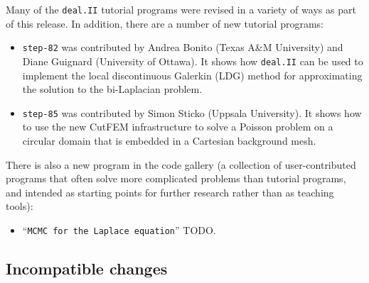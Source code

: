 \documentclass{ansarticle-preprint}
\newcommand{\specialword}[1]{\texttt{#1}}
\newcommand{\dealii}{{\specialword{deal.II}}\xspace}
\begin{document}
Many of the \dealii{} tutorial programs were revised in a variety of
ways as part of this release. In addition, there are a number of new tutorial programs:
\begin{itemize}
\item \texttt{step-82} was contributed by Andrea Bonito (Texas A\&M University) and Diane Guignard (University of Ottawa). It shows how
\dealii{} can be used to implement the
local discontinuous Galerkin (LDG) method for approximating the solution to the bi-Laplacian problem.
\item \texttt{step-85} was contributed by Simon Sticko (Uppsala University). It shows how to use the new CutFEM infrastructure to solve a Poisson 
problem on a circular domain that is embedded in a Cartesian background mesh.
\end{itemize}

There is also a new program in the code gallery (a collection of
user-contributed programs that often solve more complicated problems
than tutorial programs, and intended as starting points for further
research rather than as teaching tools):
\begin{itemize}
\item ``\texttt{MCMC for the Laplace equation}'' TODO.
\end{itemize}



\subsection{Incompatible changes}\label{subsec:deprecated}
\end{document}
